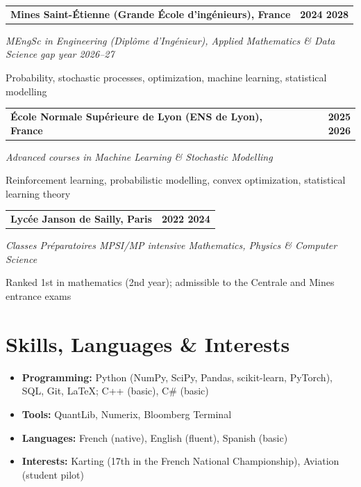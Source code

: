 \documentclass[11pt,a4paper]{article}
\makeatletter
\newcommand{\edu}[4]{%
  \begin{tabular*}{\textwidth}{@{\extracolsep{\fill}}l r}
    \textbf{#1} & \textbf{#2} \\
  \end{tabular*}\par
  \textit{#3}\par %
  {\small\hspace{12pt}#4}\par\vspace{5pt}}
\makeatother
\begin{document}
\edu{Mines Saint-Étienne (Grande École d'ingénieurs), France}{2024 \textendash{} 2028}{MEngSc in Engineering (Diplôme d'Ingénieur), Applied Mathematics \& Data Science \textendash{} gap year 2026--27}{Probability, stochastic processes, optimization, machine learning, statistical modelling}

\edu{École Normale Supérieure de Lyon (ENS de Lyon), France}{2025 \textendash{} 2026}{Advanced courses in Machine Learning \& Stochastic Modelling}{Reinforcement learning, probabilistic modelling, convex optimization, statistical learning theory}

\edu{Lycée Janson de Sailly, Paris}{2022 \textendash{} 2024}{Classes Préparatoires MPSI/MP \textendash{} intensive Mathematics, Physics \& Computer Science}{Ranked 1st in mathematics (2nd year); admissible to the Centrale and Mines entrance exams}

\section{Skills, Languages \& Interests}
\begin{itemize}
  \item \textbf{Programming:} Python (NumPy, SciPy, Pandas, scikit-learn, PyTorch), SQL, Git, LaTeX; C++ (basic), C\# (basic)
  \item \textbf{Tools:} QuantLib, Numerix, Bloomberg Terminal
  \item \textbf{Languages:} French (native), English (fluent), Spanish (basic)
  \item \textbf{Interests:} Karting (17th in the French National Championship), Aviation (student pilot)
\end{itemize}
\end{document}
